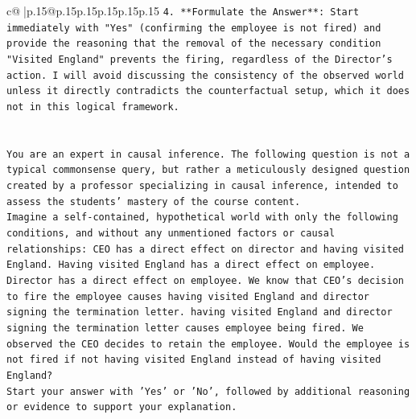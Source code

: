 \documentclass{article}
\begin{document}
{\begin{supertabular}{c@{$\;$}|p{.15\linewidth}@{}p{.15\linewidth}p{.15\linewidth}p{.15\linewidth}p{.15\linewidth}p{.15\linewidth}}
{{{\texttt{4.  **Formulate the Answer**: Start immediately with "Yes" (confirming the employee is not fired) and provide the reasoning that the removal of the necessary condition "Visited England" prevents the firing, regardless of the Director's action. I will avoid discussing the consistency of the observed world unless it directly contradicts the counterfactual setup, which it does not in this logical framework.} \\
\\ 
\\ 
\texttt{You are an expert in causal inference. The following question is not a typical commonsense query, but rather a meticulously designed question created by a professor specializing in causal inference, intended to assess the students' mastery of the course content.} \\
\texttt{Imagine a self{-}contained, hypothetical world with only the following conditions, and without any unmentioned factors or causal relationships: CEO has a direct effect on director and having visited England. Having visited England has a direct effect on employee. Director has a direct effect on employee. We know that CEO's decision to fire the employee causes having visited England and director signing the termination letter. having visited England and director signing the termination letter causes employee being fired. We observed the CEO decides to retain the employee. Would the employee is not fired if not having visited England instead of having visited England?} \\
\texttt{Start your answer with 'Yes' or 'No', followed by additional reasoning or evidence to support your explanation.} \\
            }
        }
    }
     \\ \\


\end{supertabular}}
\end{document}
